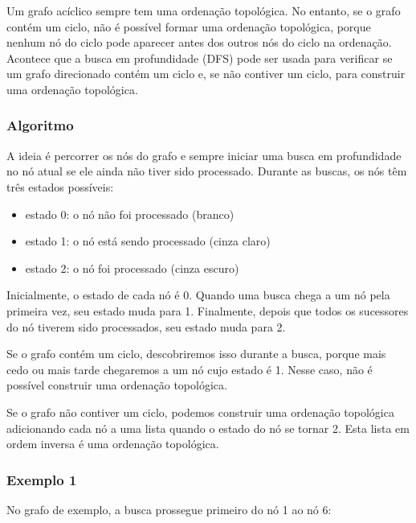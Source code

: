 Um grafo acíclico sempre tem uma ordenação topológica.
No entanto, se o grafo contém um ciclo,
não é possível formar uma ordenação topológica,
porque nenhum nó do ciclo pode aparecer
antes dos outros nós do ciclo na ordenação.
Acontece que a busca em profundidade (DFS) pode ser usada
para verificar se um grafo direcionado contém um ciclo
e, se não contiver um ciclo, para construir uma ordenação topológica.

\subsubsection{Algoritmo}

A ideia é percorrer os nós do grafo
e sempre iniciar uma busca em profundidade no nó atual
se ele ainda não tiver sido processado.
Durante as buscas, os nós têm três estados possíveis:

\begin{itemize}
\item estado 0: o nó não foi processado (branco)
\item estado 1: o nó está sendo processado (cinza claro)
\item estado 2: o nó foi processado (cinza escuro)
\end{itemize}

Inicialmente, o estado de cada nó é 0.
Quando uma busca chega a um nó pela primeira vez,
seu estado muda para 1.
Finalmente, depois que todos os sucessores do nó tiverem
sido processados, seu estado muda para 2.

Se o grafo contém um ciclo, descobriremos isso
durante a busca, porque mais cedo ou mais tarde
chegaremos a um nó cujo estado é 1.
Nesse caso, não é possível construir uma ordenação topológica.

Se o grafo não contiver um ciclo, podemos construir
uma ordenação topológica adicionando cada nó a uma lista quando o estado do nó se tornar 2.
Esta lista em ordem inversa é uma ordenação topológica.

\subsubsection{Exemplo 1}

No grafo de exemplo, a busca prossegue primeiro
do nó 1 ao nó 6:

